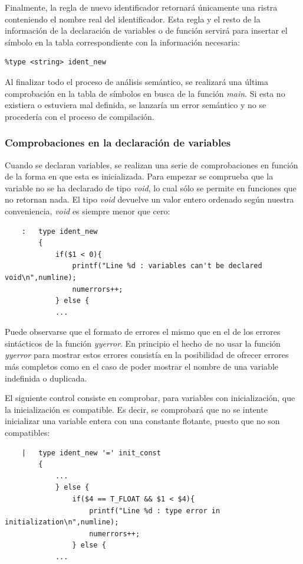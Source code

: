 \documentclass[a4paper,10pt]{article}
\begin{document}
Finalmente, la regla de nuevo identificador retornará únicamente una ristra conteniendo el nombre real del identificador. Esta regla y el resto de la información de la declaración de variables o de función servirá para insertar el símbolo en la tabla correspondiente con la información necesaria:

\begin{lstlisting}
%type <string> ident_new
\end{lstlisting}

Al finalizar todo el proceso de análisis semántico, se realizará una última comprobación en la tabla de símbolos en busca de la función \textit{main}. Si esta no existiera o estuviera mal definida, se lanzaría un error semántico y no se procedería con el proceso de compilación.

\subsubsection{Comprobaciones en la declaración de variables}

Cuando se declaran variables, se realizan una serie de comprobaciones en función de la forma en que esta es inicializada. Para empezar se comprueba que la variable no se ha declarado de tipo \textit{void}, lo cual sólo se permite en funciones que no retornan nada. El tipo \textit{void} devuelve un valor entero ordenado según nuestra conveniencia, \textit{void} es siempre menor que cero:

\begin{lstlisting}
	:	type ident_new 
		{
			if($1 < 0){
				printf("Line %d : variables can't be declared void\n",numline);
				numerrors++;
			} else {
			...
\end{lstlisting}

Puede observarse que el formato de errores el mismo que en el de los errores sintácticos de la función \textit{yyerror}. En principio el hecho de no usar la función \textit{yyerror} para mostrar estos errores consistía en la posibilidad de ofrecer errores más completos como en el caso de poder mostrar el nombre de una variable indefinida o duplicada.

El siguiente control consiste en comprobar, para variables con inicialización, que la inicialización es compatible. Es decir, se comprobará que no se intente inicializar una variable entera con una constante flotante, puesto que no son compatibles:
\begin{lstlisting}
	|	type ident_new '=' init_const 
		{
			...
			} else {
				if($4 == T_FLOAT && $1 < $4){
					printf("Line %d : type error in initialization\n",numline);
					numerrors++;
				} else {
			...
\end{lstlisting}
\end{document}
